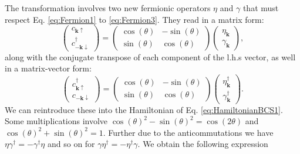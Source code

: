 \documentclass[../main.tex]{subfile}
\begin{document}
The transformation involves two new fermionic operators $\eta$ and $\gamma$ that must respect Eq. \ref{eq:Fermion1} to \ref{eq:Fermion3}. They read in a matrix form:
\begin{equation}\label{eq:RotationBasis_c1}
    \begin{pmatrix}
        c_{\bm{k}\uparrow}\\
        c_{-\bm{k}\downarrow}^{\dagger}
    \end{pmatrix} = 
    \begin{pmatrix}
        \cos(\theta) & -\sin(\theta)\\
        \sin(\theta) & \cos(\theta)
    \end{pmatrix}
    \begin{pmatrix}
        \eta_{\bm{k}}\\
        \gamma_{\bm{k}}
    \end{pmatrix},
\end{equation}
along with the conjugate transpose of each component of the l.h.s vector, as well in a matrix-vector form:
\begin{equation}\label{eq:RotationBasis_c2}
    \begin{pmatrix}
        c_{\bm{k}\uparrow}^{\dagger} \\
        c_{-\bm{k}\downarrow}
    \end{pmatrix} = 
    \begin{pmatrix}
        \cos(\theta) & -\sin(\theta)\\
        \sin(\theta) & \cos(\theta)
    \end{pmatrix}
    \begin{pmatrix}
        \eta_{\bm{k}}^{\dagger} \\
        \gamma_{\bm{k}}^{\dagger}
    \end{pmatrix}.
\end{equation}
We can reintroduce these into the Hamiltonian of Eq. \ref{eq:HamiltonianBCS1}. 
Some multiplications involve $\cos(\theta)^2 - \sin(\theta)^2 = \cos(2\theta)$ and $\cos(\theta)^2 + \sin(\theta)^2 = 1$. 
Further due to the anticommutations we have $\eta \gamma^{\dagger} = - \gamma^{\dagger}\eta$ and so on for $\gamma \eta^{\dagger} = - \eta^{\dagger}\gamma$.
We obtain the following expression
\end{document}
